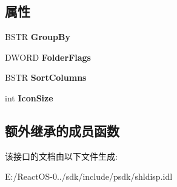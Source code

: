 \subsection*{属性}
\begin{DoxyCompactItemize}
\item 
\mbox{\label{interface_shell32_1_1_i_shell_folder_view_dual3_a5c081078f996ceca532efa647e57f45a}} 
B\+S\+TR {\bfseries Group\+By}
\item 
\mbox{\label{interface_shell32_1_1_i_shell_folder_view_dual3_a50d9297ad5b5ee64cb911b4e18d98947}} 
D\+W\+O\+RD {\bfseries Folder\+Flags}
\item 
\mbox{\label{interface_shell32_1_1_i_shell_folder_view_dual3_a6db23be665dcf0e82dd3320a24d1ff93}} 
B\+S\+TR {\bfseries Sort\+Columns}
\item 
\mbox{\label{interface_shell32_1_1_i_shell_folder_view_dual3_a9adc886973bd4634b2eda751db387b08}} 
int {\bfseries Icon\+Size}
\end{DoxyCompactItemize}
\subsection*{额外继承的成员函数}


该接口的文档由以下文件生成\+:\begin{DoxyCompactItemize}
\item 
E\+:/\+React\+O\+S-\/0../sdk/include/psdk/shldisp.\+idl\end{DoxyCompactItemize}
